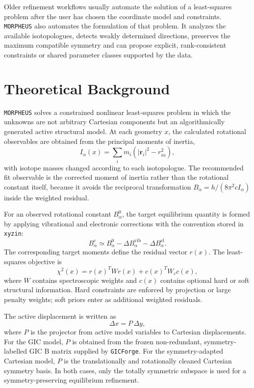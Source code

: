 \documentclass[11pt]{article}
\newcommand{\program}{\texttt{MORPHEUS}}
\newcommand{\xyzin}{\texttt{xyzin}}
\newcommand{\gicforge}{\texttt{GICForge}}
\begin{document}
Older refinement workflows usually automate the solution of a least-squares
problem after the user has chosen the coordinate model and constraints.
\program{} also automates the formulation of that problem.  It analyzes the
available isotopologues, detects weakly determined directions, preserves the
maximum compatible symmetry and can propose explicit, rank-consistent
constraints or shared parameter classes supported by the data.

\section{Theoretical Background}

\program{} solves a constrained nonlinear least-squares problem in which the
unknowns are not arbitrary Cartesian components but an algorithmically generated
active structural model.  At each geometry \(x\), the calculated rotational
observables are obtained from the principal moments of inertia,
\[
  I_\alpha(x) = \sum_i m_i\left(|\mathbf{r}_i|^2-r_{i\alpha}^2\right),
\]
with isotope masses changed according to each isotopologue.  The recommended
fit observable is the corrected moment of inertia rather than the rotational
constant itself, because it avoids the reciprocal transformation
\(B_\alpha=h/(8\pi^2 c I_\alpha)\) inside the weighted residual.

For an observed rotational constant \(B^0_\alpha\), the target equilibrium
quantity is formed by applying vibrational and electronic corrections with the
convention stored in \xyzin{}:
\[
  B^e_\alpha \simeq B^0_\alpha - \Delta B^\mathrm{vib}_\alpha
                         - \Delta B^\mathrm{el}_\alpha .
\]
The corresponding target moments define the residual vector \(r(x)\).  The
least-squares objective is
\[
  \chi^2(x)=r(x)^T W r(x) + c(x)^T W_c c(x),
\]
where \(W\) contains spectroscopic weights and \(c(x)\) contains optional hard
or soft structural information.  Hard constraints are enforced by projection or
large penalty weights; soft priors enter as additional weighted residuals.

The active displacement is written as
\[
  \Delta x = P\,\Delta y,
\]
where \(P\) is the projector from active model variables to Cartesian
displacements.  For the GIC model, \(P\) is obtained from the frozen
non-redundant, symmetry-labelled GIC B matrix supplied by \gicforge{}.  For the
symmetry-adapted Cartesian model, \(P\) is the translationally and rotationally
cleaned Cartesian symmetry basis.  In both cases, only the totally symmetric
subspace is used for a symmetry-preserving equilibrium refinement.
\end{document}
